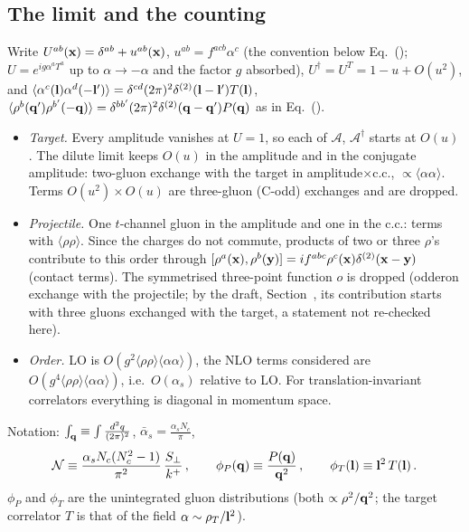 \subsection{The limit and the counting}\label{sec:d-limit}
Write $U^{ab}(\mathbf{x})=\delta^{ab}+u^{ab}(\mathbf{x})$, $u^{ab}=f^{acb}\alpha^c$ (the convention below Eq.~(); $U=e^{ig\alpha^aT^a}$ up to $\alpha\to-\alpha$ and the factor $g$ absorbed), $U^\dagger=U^T=1-u+O(u^2)$, and $\langle\alpha^c(\mathbf{l})\alpha^d(-\mathbf{l}')\rangle=\delta^{cd}(2\pi)^2\delta^{(2)}(\mathbf{l}-\mathbf{l}')T(\mathbf{l})$, $\langle\rho^b(\mathbf{q}')\rho^{b'}(-\mathbf{q})\rangle=\delta^{bb'}(2\pi)^2\delta^{(2)}(\mathbf{q}-\mathbf{q}')P(\mathbf{q})$ as in Eq.~().
\begin{itemize}
\item \emph{Target.} Every amplitude vanishes at $U=1$, so each of $\mathcal A$, $\mathcal A^\dagger$ starts at $O(u)$. The dilute limit keeps $O(u)$ in the amplitude and in the conjugate amplitude: two-gluon exchange with the target in amplitude$\times$c.c., $\propto\langle\alpha\alpha\rangle$. Terms $O(u^2)\times O(u)$ are three-gluon (C-odd) exchanges and are dropped.
\item \emph{Projectile.} One $t$-channel gluon in the amplitude and one in the c.c.: terms with $\langle\rho\rho\rangle$. Since the charges do not commute, products of two or three $\rho$'s contribute to this order through $[\rho^a(\mathbf{x}),\rho^b(\mathbf{y})]=if^{abc}\rho^c(\mathbf{x})\delta^{(2)}(\mathbf{x}-\mathbf{y})$ (contact terms). The symmetrised three-point function $o$ is dropped (odderon exchange with the projectile; by the draft, Section~, its contribution starts with three gluons exchanged with the target, a statement not re-checked here).
\item \emph{Order.} LO is $O(g^2\langle\rho\rho\rangle\langle\alpha\alpha\rangle)$, the NLO terms considered are $O(g^4\langle\rho\rho\rangle\langle\alpha\alpha\rangle)$, i.e.\ $O(\alpha_s)$ relative to LO. For translation-invariant correlators everything is diagonal in momentum space.
\end{itemize}
Notation: $\int_{\mathbf{q}}\equiv\int\frac{d^2q}{(2\pi)^2}$, $\bar\alpha_s=\frac{\alpha_sN_c}{\pi}$,
\begin{align}
\mathcal N\equiv\frac{\alpha_sN_c(N_c^2-1)}{\pi^2}\,\frac{S_\perp}{k^+}\,,\qquad
\phi_P(\mathbf{q})\equiv\frac{P(\mathbf{q})}{\mathbf{q}^2}\,,\qquad \phi_T(\mathbf{l})\equiv\mathbf{l}^2\,T(\mathbf{l})\,.\label{d:not}
\end{align}
$\phi_P$ and $\phi_T$ are the unintegrated gluon distributions (both $\propto\rho^2/\mathbf{q}^2$; the target correlator $T$ is that of the field $\alpha\sim\rho_T/\mathbf{l}^2$).

